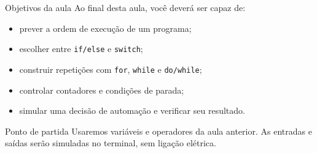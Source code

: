 \begin{frame}{Objetivos da aula}
Ao final desta aula, você deverá ser capaz de:
\begin{itemize}
\item prever a ordem de execução de um programa;
\item escolher entre \texttt{if/else} e \texttt{switch};
\item construir repetições com \texttt{for}, \texttt{while} e \texttt{do/while};
\item controlar contadores e condições de parada;
\item simular uma decisão de automação e verificar seu resultado.
\end{itemize}
\begin{block}{Ponto de partida}
Usaremos variáveis e operadores da aula anterior. As entradas e saídas serão simuladas no terminal, sem ligação elétrica.
\end{block}
\end{frame}
